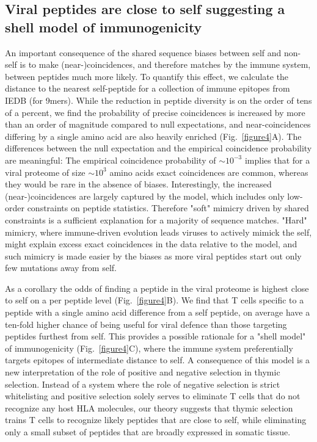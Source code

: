 \documentclass[superscriptaddress,twocolumn,pre]{revtex4}
\newcommand{\<}{\langle}
\renewcommand{\>}{\rangle}
\begin{document}
\subsection{Viral peptides are close to self suggesting a shell model of immunogenicity}

An important consequence of the shared sequence biases between self and non-self is to make (near-)coincidences, and therefore matches by the immune system, between peptides much more likely. To quantify this effect, we calculate the distance to the nearest self-peptide for a collection of immune epitopes from IEDB (for 9mers). While the reduction in peptide diversity is on the order of tens of a percent, we find the probability of precise coincidences is increased by more than an order of magnitude compared to null expectations, and near-coincidences differing by a single amino acid are also heavily enriched (Fig.~\ref{figure4}A). The differences between the null expectation and the empirical coincidence probability are meaningful: The empirical coincidence probability of $\sim 10^{-3}$ implies that for a viral proteome of size $\sim 10^3$ amino acids exact coincidences are common, whereas they would be rare in the absence of biases. Interestingly, the increased (near-)coincidences are largely captured by the model, which includes only low-order constraints on peptide statistics. Therefore "soft" mimicry driven by shared constraints is a sufficient explanation for a majority of sequence matches. "Hard" mimicry, where immune-driven evolution leads viruses to actively mimick the self, might explain excess exact coincidences in the data relative to the model, and such mimicry is made easier by the biases as more viral peptides start out only few mutations away from self.

As a corollary the odds of finding a peptide in the viral proteome is highest close to self on a per peptide level (Fig.~\ref{figure4}B). We find that T cells specific to a peptide with a single amino acid difference from a self peptide, on average have a ten-fold higher chance of being useful for viral defence than those targeting peptides furthest from self. This provides a possible rationale for a "shell model" of immunogenicity (Fig.~\ref{figure4}C), where the immune system preferentially targets epitopes of intermediate distance to self. A consequence of this model is a new interpretation of the role of positive and negative selection in thymic selection. Instead of a system where the role of negative selection is strict whitelisting and positive selection solely serves to eliminate T cells that do not recognize any host HLA molecules, our theory suggests that thymic selection trains T cells to recognize likely peptides that are close to self, while eliminating only a small subset of peptides that are broadly expressed in somatic tissue.
\end{document}
